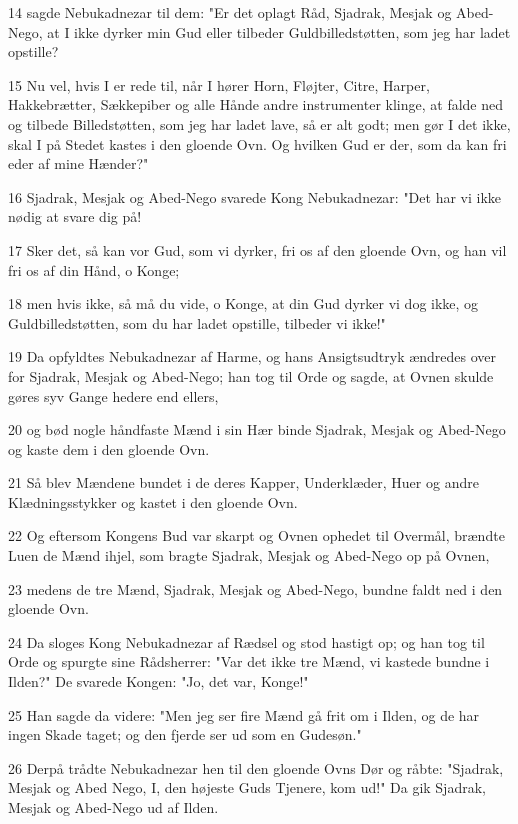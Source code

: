 \par 14 sagde Nebukadnezar til dem: "Er det oplagt Råd, Sjadrak, Mesjak og Abed-Nego, at I ikke dyrker min Gud eller tilbeder Guldbilledstøtten, som jeg har ladet opstille?
\par 15 Nu vel, hvis I er rede til, når I hører Horn, Fløjter, Citre, Harper, Hakkebrætter, Sækkepiber og alle Hånde andre instrumenter klinge, at falde ned og tilbede Billedstøtten, som jeg har ladet lave, så er alt godt; men gør I det ikke, skal I på Stedet kastes i den gloende Ovn. Og hvilken Gud er der, som da kan fri eder af mine Hænder?"
\par 16 Sjadrak, Mesjak og Abed-Nego svarede Kong Nebukadnezar: "Det har vi ikke nødig at svare dig på!
\par 17 Sker det, så kan vor Gud, som vi dyrker, fri os af den gloende Ovn, og han vil fri os af din Hånd, o Konge;
\par 18 men hvis ikke, så må du vide, o Konge, at din Gud dyrker vi dog ikke, og Guldbilledstøtten, som du har ladet opstille, tilbeder vi ikke!"
\par 19 Da opfyldtes Nebukadnezar af Harme, og hans Ansigtsudtryk ændredes over for Sjadrak, Mesjak og Abed-Nego; han tog til Orde og sagde, at Ovnen skulde gøres syv Gange hedere end ellers,
\par 20 og bød nogle håndfaste Mænd i sin Hær binde Sjadrak, Mesjak og Abed-Nego og kaste dem i den gloende Ovn.
\par 21 Så blev Mændene bundet i de deres Kapper, Underklæder, Huer og andre Klædningsstykker og kastet i den gloende Ovn.
\par 22 Og eftersom Kongens Bud var skarpt og Ovnen ophedet til Overmål, brændte Luen de Mænd ihjel, som bragte Sjadrak, Mesjak og Abed-Nego op på Ovnen,
\par 23 medens de tre Mænd, Sjadrak, Mesjak og Abed-Nego, bundne faldt ned i den gloende Ovn.
\par 24 Da sloges Kong Nebukadnezar af Rædsel og stod hastigt op; og han tog til Orde og spurgte sine Rådsherrer: "Var det ikke tre Mænd, vi kastede bundne i Ilden?" De svarede Kongen: "Jo, det var, Konge!"
\par 25 Han sagde da videre: "Men jeg ser fire Mænd gå frit om i Ilden, og de har ingen Skade taget; og den fjerde ser ud som en Gudesøn."
\par 26 Derpå trådte Nebukadnezar hen til den gloende Ovns Dør og råbte: "Sjadrak, Mesjak og Abed Nego, I, den højeste Guds Tjenere, kom ud!" Da gik Sjadrak, Mesjak og Abed-Nego ud af Ilden.
